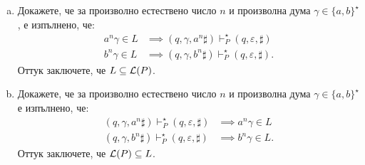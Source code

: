\begin{extra}
\begin{example}
  \begin{enumerate}[a)]
  \item
    Докажете, че за произволно естествено число $n$ и произволна дума $\gamma \in \{a, b\}^\star$, е изпълнено, че:
    \begin{align*}
      a^n\gamma \in L & \implies (q, \gamma, a^n\sharp) \vdash^\star_P (q, \varepsilon, \sharp)\\
      b^n\gamma \in L & \implies (q, \gamma, b^n\sharp) \vdash^\star_P (q, \varepsilon, \sharp).
    \end{align*}
    Оттук заключете, че $L \subseteq \mathcal{L}(P)$.
  \item
    Докажете, че за произволно естествено число $n$ и произволна дума $\gamma \in \{a, b\}^\star$ е изпълнено, че:
    \begin{align*}
      (q, \gamma, a^n\sharp) \vdash^\star_P (q, \varepsilon, \sharp) & \implies a^n\gamma \in L\\
      (q, \gamma, b^n\sharp) \vdash^\star_P (q, \varepsilon, \sharp) & \implies b^n\gamma \in L.
    \end{align*}
    Оттук заключете, че $\mathcal{L}(P) \subseteq L$.
  \end{enumerate}
\end{example}


\end{extra}
